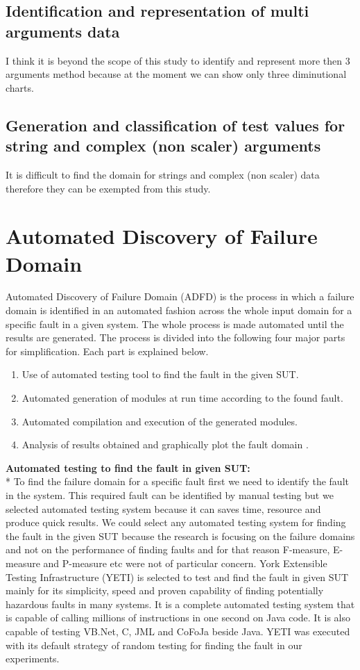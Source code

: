 \documentclass{acm_proc_article-sp}
\begin{document}
\subsection{Identification and representation of multi arguments data}
I think it is beyond the scope of this study to identify and represent more then 3 arguments method because at the moment we can show only three diminutional charts.
\subsection{Generation and classification of test values for string and complex (non scaler) arguments}
It is difficult to find the domain for strings and complex (non scaler) data therefore they can be exempted from this study.


\section{Automated Discovery of Failure Domain}

Automated Discovery of Failure Domain (ADFD) is the process in which a failure domain is identified in an automated fashion across the whole input domain for a specific fault in a given system. The whole process is made automated until the results are generated. The process is divided into the following four major parts for simplification. Each part is explained below.
\begin{enumerate}
\item Use of automated testing tool to find the fault in the given SUT.
\item Automated generation of modules at run time according to the found fault.
\item Automated compilation and execution of the generated modules.
\item Analysis of results obtained and graphically plot the fault domain .\\
\end{enumerate}

\noindent \textbf{Automated testing to find the fault in given SUT:}\\*
\indent To find the failure domain for a specific fault first we need to identify the fault in the system. This required fault can be identified by manual testing but we selected automated testing system because it can saves time, resource and produce quick results. We could select any automated testing system for finding the fault in the given SUT because the research is focusing on the failure domains and not on the performance of finding faults and for that reason F-measure, E-measure and P-measure etc were not of particular concern. York Extensible Testing Infrastructure (YETI) is selected to test and find the fault in given SUT mainly for its simplicity, speed and proven capability of finding potentially hazardous faults in many systems. It is a complete automated testing system that is capable of calling millions of instructions in one second on Java code. It is also capable of testing VB.Net, C, JML and CoFoJa beside Java. YETI was executed with its default strategy of random testing for finding the fault in our experiments.\\
\end{document}
